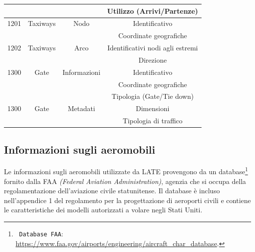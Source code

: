 \documentclass[a4paper, 12pt]{article}
\begin{document}
\begin{table}[p]
{\begin{tabular}{ c | c | c | c }
					 &    &   &   Utilizzo (Arrivi/Partenze)\\
					
					\hline
					
					1201 & Taxiways & Nodo & Identificativo \\
					
					& & & Coordinate geografiche\\
					
					\hline
					
					1202 & Taxiways & Arco & Identificativi nodi agli estremi \\
					
					& & &  Direzione\\
					
					\hline
					
					1300 & Gate & Informazioni & Identificativo \\
					
					& & &  Coordinate geografiche\\
					
					& & &  Tipologia (Gate/Tie down)\\
					
					\hline
					
					1300 & Gate & Metadati & Dimensioni \\
					
					& & &  Tipologia di traffico\\
					
					\bottomrule
		
				\end{tabular}%
				}

		
				\egroup
		
			
			
		\end{table}


	\subsection{Informazioni sugli aeromobili}
		Le informazioni sugli aeromobili utilizzate da LATE provengono da un database\footnote{\texttt{ Database FAA}: \url{https://www.faa.gov/airports/engineering/aircraft_char_database}.} fornito dalla FAA \textit{(Federal Aviation Administration)}, agenzia che si occupa della regolamentazione dell’aviazione civile statunitense. Il database è incluso nell’appendice 1 del regolamento per la progettazione di aeroporti civili e contiene le caratteristiche dei modelli autorizzati a volare negli Stati Uniti.
		
\end{document}
